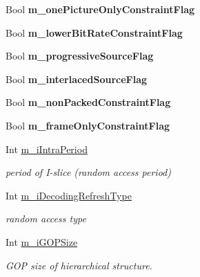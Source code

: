 \begin{DoxyCompactItemize}
Bool {\bfseries m\+\_\+one\+Picture\+Only\+Constraint\+Flag}
\item 
\mbox{\label{class_t_app_enc_cfg_ab81fd00141b523606d72d025ceef8113}} 
Bool {\bfseries m\+\_\+lower\+Bit\+Rate\+Constraint\+Flag}
\item 
\mbox{\label{class_t_app_enc_cfg_a9d99f294631b1ab3ab18fa46fb0d20f8}} 
Bool {\bfseries m\+\_\+progressive\+Source\+Flag}
\item 
\mbox{\label{class_t_app_enc_cfg_aa20f2b065c73eba2abc6fc8b5e89ffc4}} 
Bool {\bfseries m\+\_\+interlaced\+Source\+Flag}
\item 
\mbox{\label{class_t_app_enc_cfg_a22fd7b2200515c6c77931c633edad0eb}} 
Bool {\bfseries m\+\_\+non\+Packed\+Constraint\+Flag}
\item 
\mbox{\label{class_t_app_enc_cfg_a70c8407863258c5fe754510d91873458}} 
Bool {\bfseries m\+\_\+frame\+Only\+Constraint\+Flag}
\item 
\mbox{\label{class_t_app_enc_cfg_a3d2dd359c77e423350eeb0f33e2a1f37}} 
Int \hyperlink{class_t_app_enc_cfg_a3d2dd359c77e423350eeb0f33e2a1f37}{m\+\_\+i\+Intra\+Period}
\begin{DoxyCompactList}\small\item\em period of I-\/slice (random access period) \end{DoxyCompactList}\item 
\mbox{\label{class_t_app_enc_cfg_a668f81f9d8df0efb681b7cd1fa6bad81}} 
Int \hyperlink{class_t_app_enc_cfg_a668f81f9d8df0efb681b7cd1fa6bad81}{m\+\_\+i\+Decoding\+Refresh\+Type}
\begin{DoxyCompactList}\small\item\em random access type \end{DoxyCompactList}\item 
\mbox{\label{class_t_app_enc_cfg_abfeaf2754e302682c2e98d9c9b405456}} 
Int \hyperlink{class_t_app_enc_cfg_abfeaf2754e302682c2e98d9c9b405456}{m\+\_\+i\+G\+O\+P\+Size}
\begin{DoxyCompactList}\small\item\em G\+OP size of hierarchical structure. \end{DoxyCompactList}\item 

\end{DoxyCompactItemize}
